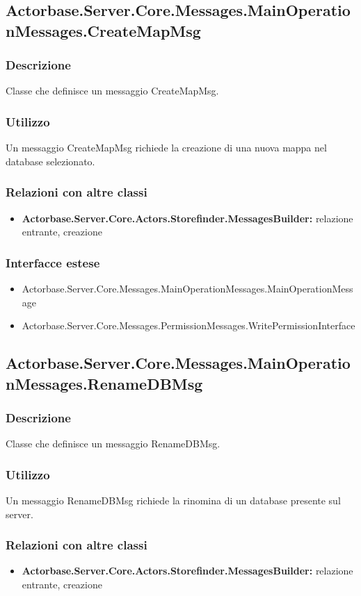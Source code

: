 \documentclass[a4paper]{article}
\begin{document}
			\subsection{Actorbase.Server.Core.Messages.MainOperationMessages.CreateMapMsg}
			\subsubsection{Descrizione}
				Classe che definisce un messaggio CreateMapMsg.
			\subsubsection{Utilizzo}
				Un messaggio CreateMapMsg richiede la creazione di una nuova mappa nel database selezionato.
			\subsubsection{Relazioni con altre classi}
			\begin{itemize}
				\item \textbf{Actorbase.Server.Core.Actors.Storefinder.MessagesBuilder:} relazione entrante, creazione
			\end{itemize}
			\subsubsection{Interfacce estese}
			\begin{itemize}
				\item Actorbase.Server.Core.Messages.MainOperationMessages.MainOperationMessage
				\item Actorbase.Server.Core.Messages.PermissionMessages.WritePermissionInterface
			\end{itemize}

			\subsection{Actorbase.Server.Core.Messages.MainOperationMessages.RenameDBMsg}
			\subsubsection{Descrizione}
				Classe che definisce un messaggio RenameDBMsg.
			\subsubsection{Utilizzo}
				Un messaggio RenameDBMsg richiede la rinomina di un database presente sul server.
			\subsubsection{Relazioni con altre classi}
			\begin{itemize}
				\item \textbf{Actorbase.Server.Core.Actors.Storefinder.MessagesBuilder:} relazione entrante, creazione
			\end{itemize}
\end{document}
